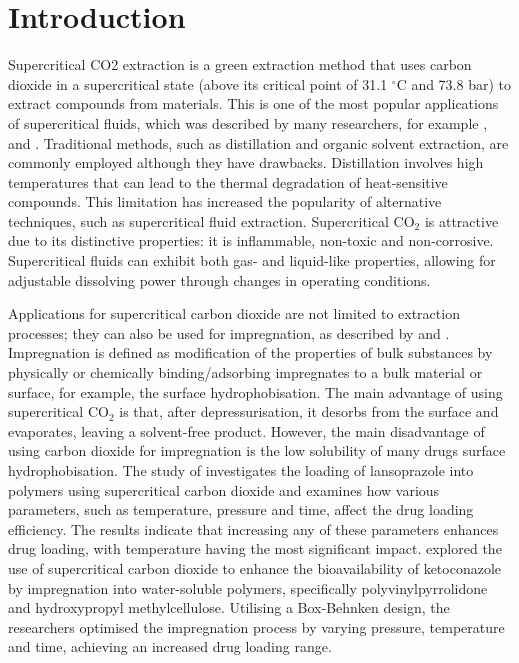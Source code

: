 \documentclass[a4paper,fleqn]{cas-dc}
\begin{document}
\maketitle


\section{Introduction}
\linenumbers
%
Supercritical CO2 extraction is a green extraction method that uses carbon dioxide in a supercritical state (above its critical point of 31.1 $^\circ$C and 73.8 bar) to extract compounds from materials. This is one of the most popular applications of supercritical fluids, which was described by many researchers, for example \citet{Sodeifian2017}, \citet{Reverchon1993} and \citet{Sovova1994}. Traditional methods, such as distillation and organic solvent extraction, are commonly employed although they have drawbacks. Distillation involves high temperatures that can lead to the thermal degradation of heat-sensitive compounds. This limitation has increased the popularity of alternative techniques, such as supercritical fluid extraction. Supercritical CO$_2$ is attractive due to its distinctive properties: it is inflammable, non-toxic and non-corrosive. Supercritical fluids can exhibit both gas- and liquid-like properties, allowing for adjustable dissolving power through changes in operating conditions.

Applications for supercritical carbon dioxide are not limited to extraction processes; they can also be used for impregnation, as described by \citet{Weidner2018} and \citet{Machado2022}. Impregnation is defined as modification of the properties of bulk substances by physically or chemically binding/adsorbing impregnates to a bulk material or surface, for example, the surface hydrophobisation. The main advantage of using supercritical CO$_2$ is that, after depressurisation, it desorbs from the surface and evaporates, leaving a solvent-free product. However, the main disadvantage of using carbon dioxide for impregnation is the low solubility of many drugs surface hydrophobisation. 
The study of \citet{Ameri2020} investigates the loading of lansoprazole into polymers using supercritical carbon dioxide and examines how various parameters, such as temperature, pressure and time, affect the drug loading efficiency. The results indicate that increasing any of these parameters enhances drug loading, with temperature having the most significant impact. \citet{Fathi2022} explored the use of supercritical carbon dioxide to enhance the bioavailability of ketoconazole by impregnation into water-soluble polymers, specifically polyvinylpyrrolidone and hydroxypropyl methylcellulose. Utilising a Box-Behnken design, the researchers optimised the impregnation process by varying pressure, temperature and time, achieving an increased drug loading range.
\end{document}
